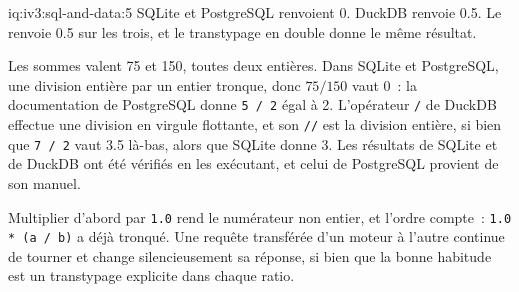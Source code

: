 \begin{solution}{iq:iv3:sql-and-data:5}
SQLite et PostgreSQL renvoient 0. DuckDB renvoie 0.5. Le  renvoie 0.5 sur les trois, et le transtypage en double donne le même résultat.
\label{lst:iv3:sq:ratiofixed}

Les sommes valent 75 et 150, toutes deux entières. Dans SQLite et PostgreSQL, une division entière par un entier tronque, donc $75 / 150$ vaut 0~: la documentation de PostgreSQL donne \texttt{5 / 2} égal à 2. L'opérateur \texttt{/} de DuckDB effectue une division en virgule flottante, et son \texttt{//} est la division entière, si bien que \texttt{7 / 2} vaut 3.5 là-bas, alors que SQLite donne 3. Les résultats de SQLite et de DuckDB ont été vérifiés en les exécutant, et celui de PostgreSQL provient de son manuel.

Multiplier d'abord par \texttt{1.0} rend le numérateur non entier, et l'ordre compte~: \texttt{1.0 * (a / b)} a déjà tronqué. Une requête transférée d'un moteur à l'autre continue de tourner et change silencieusement sa réponse, si bien que la bonne habitude est un transtypage explicite dans chaque ratio.

\end{solution}

